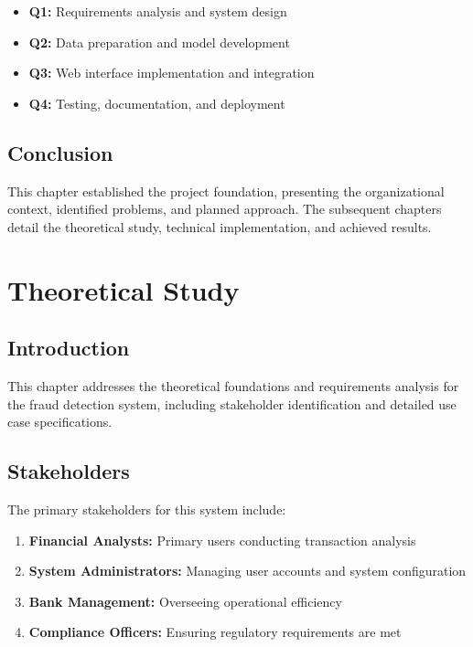 \documentclass[12pt,a4paper,twoside]{report}
\begin{document}
\begin{itemize}
    \item \textbf{Q1:} Requirements analysis and system design
    \item \textbf{Q2:} Data preparation and model development
    \item \textbf{Q3:} Web interface implementation and integration
    \item \textbf{Q4:} Testing, documentation, and deployment
\end{itemize}

\section{Conclusion}

This chapter established the project foundation, presenting the organizational context, identified problems, and planned approach. The subsequent chapters detail the theoretical study, technical implementation, and achieved results.

\chapter{Theoretical Study}

\section{Introduction}

This chapter addresses the theoretical foundations and requirements analysis for the fraud detection system, including stakeholder identification and detailed use case specifications.

\section{Stakeholders}

The primary stakeholders for this system include:

\begin{enumerate}
    \item \textbf{Financial Analysts:} Primary users conducting transaction analysis
    \item \textbf{System Administrators:} Managing user accounts and system configuration
    \item \textbf{Bank Management:} Overseeing operational efficiency
    \item \textbf{Compliance Officers:} Ensuring regulatory requirements are met
\end{enumerate}
\end{document}
